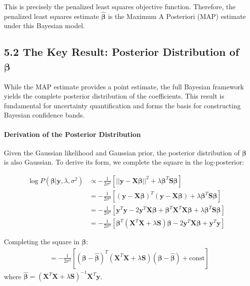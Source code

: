 \documentclass[11pt, a4paper]{article}
\begin{document}
This is precisely the penalized least squares objective function. Therefore, the penalized least squares estimate $\hat{\boldsymbol{\beta}}$ is the Maximum A Posteriori (MAP) estimate under this Bayesian model.

\subsection{5.2 The Key Result: Posterior Distribution of $\boldsymbol{\beta}$}
While the MAP estimate provides a point estimate, the full Bayesian framework yields the complete posterior distribution of the coefficients. This result is fundamental for uncertainty quantification and forms the basis for constructing Bayesian confidence bands.

\paragraph{Derivation of the Posterior Distribution}
Given the Gaussian likelihood and Gaussian prior, the posterior distribution of $\boldsymbol{\beta}$ is also Gaussian. To derive its form, we complete the square in the log-posterior:

\begin{align}
\log P(\boldsymbol{\beta} | \mathbf{y}, \lambda, \sigma^2) &\propto -\frac{1}{2\sigma^2}\left[||\mathbf{y} - \mathbf{X}\boldsymbol{\beta}||^2 + \lambda\boldsymbol{\beta}^T\mathbf{S}\boldsymbol{\beta}\right] \\
&= -\frac{1}{2\sigma^2}\left[(\mathbf{y} - \mathbf{X}\boldsymbol{\beta})^T(\mathbf{y} - \mathbf{X}\boldsymbol{\beta}) + \lambda\boldsymbol{\beta}^T\mathbf{S}\boldsymbol{\beta}\right] \\
&= -\frac{1}{2\sigma^2}\left[\mathbf{y}^T\mathbf{y} - 2\mathbf{y}^T\mathbf{X}\boldsymbol{\beta} + \boldsymbol{\beta}^T\mathbf{X}^T\mathbf{X}\boldsymbol{\beta} + \lambda\boldsymbol{\beta}^T\mathbf{S}\boldsymbol{\beta}\right] \\
&= -\frac{1}{2\sigma^2}\left[\boldsymbol{\beta}^T(\mathbf{X}^T\mathbf{X} + \lambda\mathbf{S})\boldsymbol{\beta} - 2\mathbf{y}^T\mathbf{X}\boldsymbol{\beta} + \mathbf{y}^T\mathbf{y}\right]
\end{align}

Completing the square in $\boldsymbol{\beta}$:
\begin{align}
&= -\frac{1}{2\sigma^2}\left[(\boldsymbol{\beta} - \hat{\boldsymbol{\beta}})^T(\mathbf{X}^T\mathbf{X} + \lambda\mathbf{S})(\boldsymbol{\beta} - \hat{\boldsymbol{\beta}}) + \text{const}\right]
\end{align}
where $\hat{\boldsymbol{\beta}} = (\mathbf{X}^T\mathbf{X} + \lambda\mathbf{S})^{-1}\mathbf{X}^T\mathbf{y}$.
\end{document}
